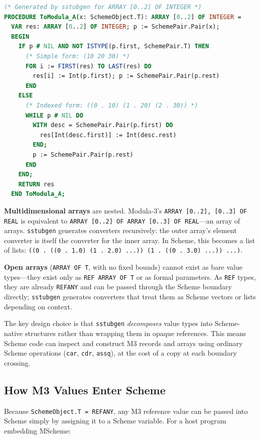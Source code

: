 \documentclass[11pt]{article}
\begin{document}
\begin{lstlisting}[language=Modula3]
(* Generated by sstubgen for ARRAY [0..2] OF INTEGER *)
PROCEDURE ToModula_A(x: SchemeObject.T): ARRAY [0..2] OF INTEGER =
  VAR res: ARRAY [0..2] OF INTEGER; p := SchemePair.Pair(x);
  BEGIN
    IF p # NIL AND NOT ISTYPE(p.first, SchemePair.T) THEN
      (* Simple form: (10 20 30) *)
      FOR i := FIRST(res) TO LAST(res) DO
        res[i] := Int(p.first); p := SchemePair.Pair(p.rest)
      END
    ELSE
      (* Indexed form: ((0 . 10) (1 . 20) (2 . 30)) *)
      WHILE p # NIL DO
        WITH desc = SchemePair.Pair(p.first) DO
          res[Int(desc.first)] := Int(desc.rest)
        END;
        p := SchemePair.Pair(p.rest)
      END
    END;
    RETURN res
  END ToModula_A;
\end{lstlisting}

\textbf{Multidimensional arrays} are nested.  Modula-3's
\texttt{ARRAY [0..2], [0..3] OF REAL} is equivalent to
\texttt{ARRAY [0..2] OF ARRAY [0..3] OF REAL}---an array of arrays.
\texttt{sstubgen} generates converters recursively: the outer array's
element converter is itself the converter for the inner array.  In
Scheme, this becomes a list of lists:
\texttt{((0 . ((0 . 1.0) (1 . 2.0) ...)) (1 . ((0 . 3.0) ...)) ...)}.

\textbf{Open arrays} (\texttt{ARRAY OF T}, with no fixed bounds)
cannot exist as bare value types---they exist only as
\texttt{REF ARRAY OF T} or as formal parameters.  As \texttt{REF}
types, they are already \texttt{REFANY} and can be passed through the
Scheme boundary directly; \texttt{sstubgen} generates converters that
treat them as Scheme vectors or lists depending on context.

The key design choice is that \texttt{sstubgen} \emph{decomposes}
value types into Scheme-native structures rather than wrapping them in
opaque references.  This means Scheme code can inspect and construct
M3 records and arrays using ordinary Scheme operations (\texttt{car},
\texttt{cdr}, \texttt{assq}), at the cost of a copy at each boundary
crossing.


\subsection{How M3 Values Enter Scheme}
\label{sec:values-enter}

Because \texttt{SchemeObject.T = REFANY}, any M3 reference value can
be passed into Scheme simply by assigning it to a Scheme variable.
For a host program embedding MScheme:
\end{document}
